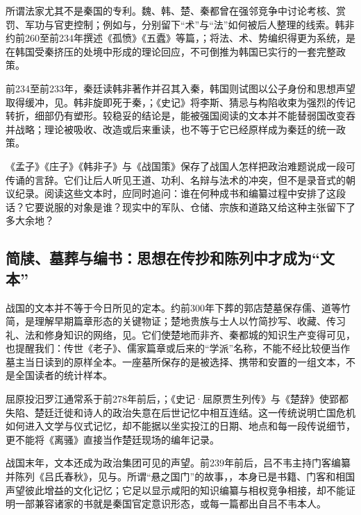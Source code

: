 所谓法家尤其不是秦国的专利。魏、韩、楚、秦都曾在强邻竞争中讨论考核、赏罚、军功与官吏控制；例如与，分别留下“术”与“法”如何被后人整理的线索。韩非约前260至前234年撰述《孤愤》《五蠹》等篇，；将法、术、势编织得更为系统，是在韩国受秦挤压的处境中形成的理论回应，不可倒推为韩国已实行的一套完整政策。

前234至前233年，秦廷读韩非著作并召其入秦，韩国则试图以公子身份和思想声望取得缓冲，见。韩非旋即死于秦，；《史记》将李斯、猜忌与构陷收束为强烈的传记转折，细部仍有塑形。较稳妥的结论是，能被强国阅读的文本并不能替弱国改变吞并战略；理论被吸收、改造或后来重读，也不等于它已经原样成为秦廷的统一政策。

\begin{textwindow}[从“说服”读到什么]
《孟子》《庄子》《韩非子》与《战国策》保存了战国人怎样把政治难题说成一段可传诵的言辞。它们让后人听见王道、功利、名辩与法术的冲突，但不是录音式的朝议纪录。阅读这些文本时，应同时追问：谁在何种成书和编纂过程中安排了这段话？它要说服的对象是谁？现实中的军队、仓储、宗族和道路又给这种主张留下了多大余地？
\end{textwindow}

\subsection{简牍、墓葬与编书：思想在传抄和陈列中才成为“文本”}

战国的文本并不等于今日所见的定本。约前300年下葬的郭店楚墓保存儒、道等竹简，是理解早期篇章形态的关键物证；楚地贵族与士人以竹简抄写、收藏、传习礼、法和修身知识的网络，见。它们使楚地而非齐、秦都城的知识生产变得可见，也提醒我们：传世《老子》、儒家篇章或后来的“学派”名称，不能不经比较便当作墓主当日读到的原样全本。一座墓所保存的是被选择、携带和安置的一组文本，不是全国读者的统计样本。

屈原投汨罗江通常系于前278年前后，；《史记·屈原贾生列传》与《楚辞》使郢都失陷、楚廷迁徙和诗人的政治失意在后世记忆中相互连结。这一传统说明亡国危机如何进入文学与仪式记忆，却不能据以坐实投江的日期、地点和每一段传说细节，更不能将《离骚》直接当作楚廷现场的编年记录。

战国末年，文本还成为政治集团可见的声望。前239年前后，吕不韦主持门客编纂并陈列《吕氏春秋》，见与。所谓“悬之国门”的故事，，本身已是书籍、门客和相国声望彼此增益的文化记忆；它足以显示咸阳的知识编纂与相权竞争相接，却不能证明一部兼容诸家的书就是秦国官定意识形态，或每一篇都出自吕不韦本人。


